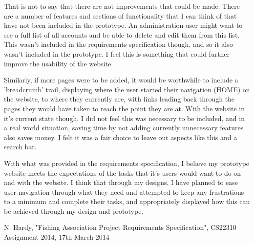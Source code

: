 \documentclass{article}
\begin{document}
That is not to say that there are not improvements that could be made. There are a number of features and sections of functionality that I can think of that have not been included in the prototype. An administration user might want to see a full list of all accounts and be able to delete and edit them from this list. This wasn't included in the requirements specification though, and so it also wasn't included in the prototype. I feel this is something that could further improve the usability of the website.

Similarly, if more pages were to be added, it would be worthwhile to include a 'breadcrumb' trail, displaying where the user started their navigation (HOME) on the website, to where they currently are, with links leading back through the pages they would have taken to reach the point they are at. With the website in it's current state though, I did not feel this was necessary to be included, and in a real world situation, saving time by not adding currently unnecessary features also saves money. I felt it was a fair choice to leave out aspects like this and a search bar.

With what was provided in the requirements specification, I believe my prototype website meets the expectations of the tasks that it's users would want to do on and with the website. I think that through my designs, I have planned to ease user navigation through what they need and attempted to keep any frustrations to a minimum and complete their tasks, and appropriately displayed how this can be achieved through my design and prototype.

\clearpage


\begin{thebibliography}{1}

 N. Hardy, "Fishing Association Project Requirements Specification", CS22310 Assignment 2014, 17th March 2014




\end{thebibliography}
\end{document}
